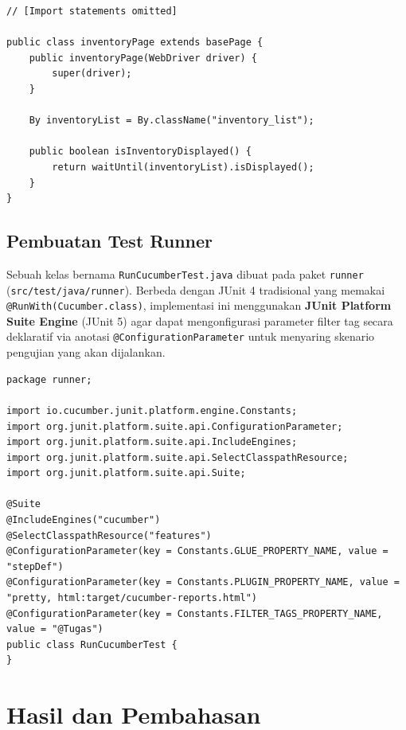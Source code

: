 \documentclass[a4paper,oneside,12pt]{report}
\newcommand{\tocboldsection}[1]{%
  \protect\renewcommand{\protect\cftchapfont}{\protect\bfseries}%
  #1%
  \protect\renewcommand{\protect\cftchapfont}{}%
}
\begin{document}
\begin{enumerate}
\begin{lstlisting}[style=javastyle, caption={Implementasi Kelas inventoryPage.java}]
// [Import statements omitted]

public class inventoryPage extends basePage {
    public inventoryPage(WebDriver driver) {
        super(driver);
    }

    By inventoryList = By.className("inventory_list");

    public boolean isInventoryDisplayed() {
        return waitUntil(inventoryList).isDisplayed();
    }
}
\end{lstlisting}
\end{enumerate}

\section{Pembuatan Test Runner}
Sebuah kelas bernama \texttt{RunCucumberTest.java} dibuat pada paket \texttt{runner} (\texttt{src/test/java/runner}). Berbeda dengan JUnit 4 tradisional yang memakai \texttt{@RunWith(Cucumber.class)}, implementasi ini menggunakan \textbf{JUnit Platform Suite Engine} (JUnit 5) agar dapat mengonfigurasi parameter filter tag secara deklaratif via anotasi \texttt{@ConfigurationParameter} untuk menyaring skenario pengujian yang akan dijalankan.

\begin{lstlisting}[style=javastyle, caption={Implementasi Kelas RunCucumberTest.java dengan JUnit Platform Suite}]
package runner;

import io.cucumber.junit.platform.engine.Constants;
import org.junit.platform.suite.api.ConfigurationParameter;
import org.junit.platform.suite.api.IncludeEngines;
import org.junit.platform.suite.api.SelectClasspathResource;
import org.junit.platform.suite.api.Suite;

@Suite
@IncludeEngines("cucumber")
@SelectClasspathResource("features")
@ConfigurationParameter(key = Constants.GLUE_PROPERTY_NAME, value = "stepDef")
@ConfigurationParameter(key = Constants.PLUGIN_PROPERTY_NAME, value = "pretty, html:target/cucumber-reports.html")
@ConfigurationParameter(key = Constants.FILTER_TAGS_PROPERTY_NAME, value = "@Tugas")
public class RunCucumberTest {
}
\end{lstlisting}

\clearpage

\chapter[\texorpdfstring{\tocboldsection{Hasil dan Pembahasan}}{Hasil dan Pembahasan}]{Hasil dan Pembahasan}
\end{document}

